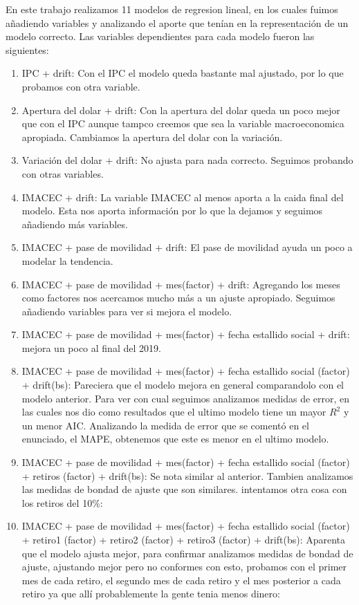 \documentclass[10pt,A4]{article}
\begin{document}
    En este trabajo realizamos 11 modelos de regresion lineal, en los cuales fuimos añadiendo variables
    y analizando el aporte que tenían en la representación de un modelo correcto. Las variables
    dependientes para cada modelo fueron las siguientes:
    \begin{enumerate}
        \item IPC + drift: Con el IPC el modelo queda bastante mal ajustado, por lo que probamos con otra variable.
        \item Apertura del dolar + drift: Con la apertura del dolar queda un poco mejor que con el IPC aunque tampco
        creemos que sea la variable macroeconomica apropiada. Cambiamos la apertura del dolar con la variación.
        \item Variación del dolar + drift: No ajusta para nada correcto. Seguimos probando con otras variables.
        \item IMACEC + drift: La variable IMACEC al menos aporta a la caida final del modelo. Esta nos aporta
        información por lo que la dejamos y seguimos añadiendo más variables.
        \item IMACEC + pase de movilidad + drift: El pase de movilidad ayuda un poco a modelar la tendencia.
        \item IMACEC + pase de movilidad + mes(factor) + drift: Agregando los meses como factores nos acercamos mucho más a un ajuste apropiado. Seguimos añadiendo variables para ver si mejora el modelo.
        \item IMACEC + pase de movilidad + mes(factor) + fecha estallido social + drift: mejora un poco al final del 2019. 
        \item IMACEC + pase de movilidad + mes(factor) + fecha estallido social (factor) + drift(bs): Pareciera que el modelo mejora en general comparandolo con el modelo anterior. Para ver con cual seguimos analizamos medidas de error, en las cuales nos dio como resultados que el ultimo modelo tiene un mayor $R^2$ y un menor AIC. Analizando la medida de error que se comentó en el enunciado, el MAPE, obtenemos que este es menor en el ultimo modelo.
        \item IMACEC + pase de movilidad + mes(factor) + fecha estallido social (factor) + retiros (factor) + drift(bs): Se nota similar al anterior. Tambien analizamos las medidas de bondad de ajuste que son similares. intentamos otra cosa con los retiros del 10\%:
        \item IMACEC + pase de movilidad + mes(factor) + fecha estallido social (factor) + retiro1 (factor) + retiro2 (factor) + retiro3 (factor) + drift(bs): Aparenta que el modelo ajusta mejor, para confirmar analizamos medidas de bondad de ajuste, ajustando mejor pero no conformes con esto, probamos con el primer mes de cada retiro, el segundo mes de cada retiro y el mes posterior a cada retiro ya que allí probablemente la gente tenia menos dinero:

\end{enumerate}
\end{document}
